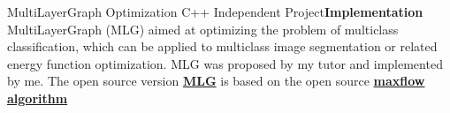 \documentclass[11pt,a4paper,sans]{moderncv}   %
\begin{document}
\begin{CJK}{UTF8}{gbsn}
{MultiLayerGraph Optimization}
{C++}
{Independent Project}{\textbf{Implementation}}
{MultiLayerGraph (MLG) aimed at optimizing the problem of multiclass classification, which can be applied to multiclass image segmentation or related energy function optimization. MLG was proposed by my tutor and implemented by me. The open source version \textbf{\href{https://github.com/liaoxl/MultiLayerGraph}{MLG}} is based on the open source \textbf{\href{http://vision.csd.uwo.ca/code/}{maxflow algorithm}}}


\renewcommand{\baselinestretch}{1.0}

\closesection{}                   %
\renewcommand{\listitemsymbol}{-} %
\clearpage\end{CJK}
\end{document}
